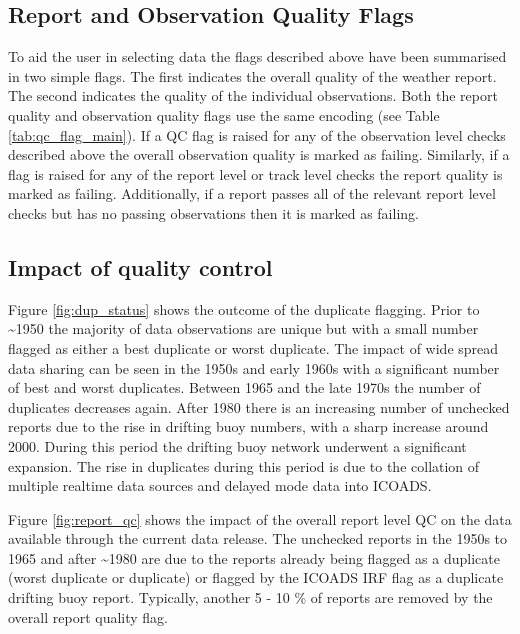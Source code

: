 \subsection{Report and Observation Quality Flags}
To aid the user in selecting data the flags described above have been summarised in two simple flags.
The first indicates the overall quality of the weather report.
The second indicates the quality of the individual observations.
Both the report quality and observation quality flags use the same encoding (see Table \ref{tab:qc_flag_main}).
If a QC flag is raised for any of the observation level checks described above the overall observation quality is marked as failing. 
Similarly, if a flag is raised for any of the report level or track level checks the report quality is marked as failing.
Additionally, if a report passes all of the relevant report level checks but has no passing observations then it is marked as failing.

 
\subsection{Impact of quality control}
Figure \ref{fig:dup_status} shows the outcome of the duplicate flagging. 
Prior to \sim 1950 the majority of data observations are unique but with a small number flagged as either a best duplicate or worst duplicate.
The impact of wide spread data sharing can be seen in the 1950s and early 1960s with a significant number of best and worst duplicates. 
Between 1965 and the late 1970s the number of duplicates decreases again.
After 1980 there is an increasing number of unchecked reports due to the rise in drifting buoy numbers, with a sharp increase around 2000.
During this period the drifting buoy network underwent a significant expansion.
The rise in duplicates during this period is due to the collation of multiple realtime data sources and delayed mode data into ICOADS.

Figure \ref{fig:report_qc} shows the impact of the overall report level QC on the data available through the current data release. 
The unchecked reports in the 1950s to 1965 and after \sim 1980 are due to the reports already being flagged as a duplicate (worst duplicate or duplicate) or flagged by the ICOADS IRF flag as a duplicate drifting buoy report.
Typically, another 5 - 10 \% of reports are removed by the overall report quality flag.

